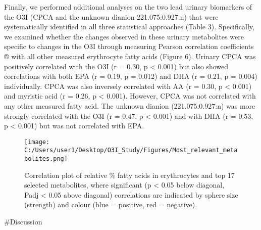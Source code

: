 \documentclass[journal=jacsat,manuscript=article]{achemso}
\begin{document}
Finally, we performed additional analyses on the two lead urinary
biomarkers of the O3I (CPCA and the unknown dianion 221.075:0.927:n)
that were systematically identified in all three statistical approaches
(Table 3). Specifically, we examined whether the changes observed in
these urinary metabolites were specific to changes in the O3I through
measuring Pearson correlation coefficients ® with all other measured
erythrocyte fatty acids (Figure 6). Urinary CPCA was positively
correlated with the O3I (r = 0.30, p \textless{} 0.001) but also showed
correlations with both EPA (r = 0.19, p = 0.012) and DHA (r = 0.21, p =
0.004) individually. CPCA was also inversely correlated with AA (r =
0.30, p \textless{} 0.001) and myristic acid (r = 0.26, p \textless{}
0.001). However, CPCA was not correlated with any other measured fatty
acid. The unknown dianion (221.075:0.927:n) was more strongly correlated
with the O3I (r = 0.47, p \textless{} 0.001) and with DHA (r = 0.53, p
\textless{} 0.001) but was not correlated with EPA.

\begin{figure}
\centering
\texttt{[image: C:/Users/user1/Desktop/O3I\_Study/Figures/Most\_relevant\_metabolites.png]}
\caption{Correlation plot of relative \% fatty acids in erythrocytes and
top 17 selected metabolites, where significant (p \textless{} 0.05 below
diagonal, Padj \textless{} 0.05 above diagonal) correlations are
indicated by sphere size (strength) and colour (blue = positive, red =
negative).}
\end{figure}

\#Discussion
\end{document}
